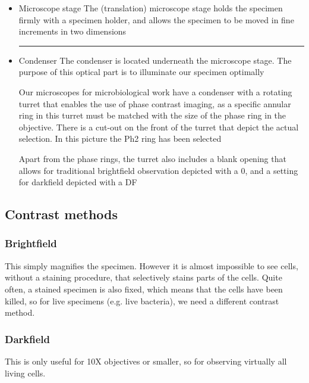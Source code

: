 \begin{highlight}
    \begin{itemize}

        \item Microscope stage
        \subitem The (translation) microscope stage holds the specimen firmly with a specimen holder, and allows the specimen to be moved in fine increments in two dimensions

        \vspace{5pt}\hrule\vspace{5pt}

        \item Condenser
        \subitem * The condenser is located underneath the
        microscope stage. The purpose of this optical part is to illuminate our specimen optimally
        
        \subitem * Our microscopes for microbiological work have a condenser with a rotating turret that enables the use of phase contrast imaging, as a specific annular ring in this turret must be matched with the size of the phase ring in the objective. There is a cut-out on the front of the turret that depict the actual selection. In this picture the Ph2 ring has been selected
    
        \subitem * Apart from the phase rings, the turret also includes a blank opening that allows for traditional brightfield observation depicted with a 0, and a setting for darkfield depicted with a DF

    \end{itemize}
\end{highlight}

\subsection{Contrast methods}

\subsubsection*{Brightfield}
This simply magnifies the specimen. However it is almost impossible to see cells, without a staining procedure, that selectively  stains parts of the cells. Quite often, a stained specimen is also fixed, which means that the cells have been killed, so for live specimens (e.g. live bacteria), we need a different contrast method.

\subsubsection*{Darkfield}
This is only useful for 10X objectives or smaller, so for 
observing virtually all living cells.

